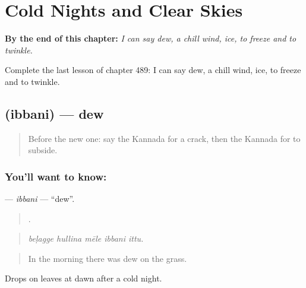 
\chapter{Cold Nights and Clear Skies}
\label{ch:ka-cold-nights-and-clear-skies}

\begin{chapteropening}
\textbf{By the end of this chapter:} \emph{I can say dew, a chill wind, ice, to freeze and to twinkle.}

Complete the last lesson of chapter 489: I can say dew, a chill wind, ice, to freeze and to twinkle.
\end{chapteropening}

\section[\texorpdfstring{\kn{ಇಬ್ಬನಿ} (ibbani)}{ಇಬ್ಬನಿ (ibbani)}]{ (ibbani) — dew}

\label{lesson:KA-C489-ibbani}



\begin{quote}
Before the new one: say the Kannada for a crack, then the Kannada for to subside.
\end{quote}

\subsection*{You'll want to know: }
\textbf{} — \emph{ibbani} — \textquotedblleft{}dew\textquotedblright{}.

\begin{quote}
    .
\end{quote}

\begin{quote}
\emph{beḷagge hullina mēle ibbani ittu.}
\end{quote}

\begin{quote}
In the morning there was dew on the grass.
\end{quote}

Drops on leaves at dawn after a cold night.

